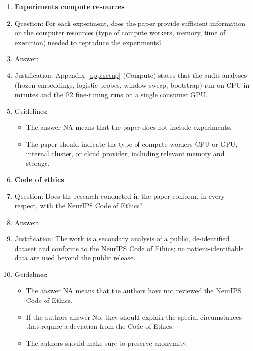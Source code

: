 \begin{enumerate}
\item {\bf Experiments compute resources}
    \item[] Question: For each experiment, does the paper provide sufficient information on the computer resources (type of compute workers, memory, time of execution) needed to reproduce the experiments?
    \item[] Answer: \answerYes{}
    \item[] Justification: Appendix~\ref{app:setup} (Compute) states that the audit analyses (frozen embeddings, logistic probes, window sweep, bootstrap) run on CPU in minutes and the F2 fine-tuning runs on a single consumer GPU.
    \item[] Guidelines:
    \begin{itemize}
        \item The answer NA means that the paper does not include experiments.
        \item The paper should indicate the type of compute workers CPU or GPU, internal cluster, or cloud provider, including relevant memory and storage.
    \end{itemize}

\item {\bf Code of ethics}
    \item[] Question: Does the research conducted in the paper conform, in every respect, with the NeurIPS Code of Ethics?
    \item[] Answer: \answerYes{}
    \item[] Justification: The work is a secondary analysis of a public, de-identified dataset and conforms to the NeurIPS Code of Ethics; no patient-identifiable data are used beyond the public release.
    \item[] Guidelines:
    \begin{itemize}
        \item The answer NA means that the authors have not reviewed the NeurIPS Code of Ethics.
        \item If the authors answer No, they should explain the special circumstances that require a deviation from the Code of Ethics.
        \item The authors should make sure to preserve anonymity.
    \end{itemize}


\end{enumerate}

